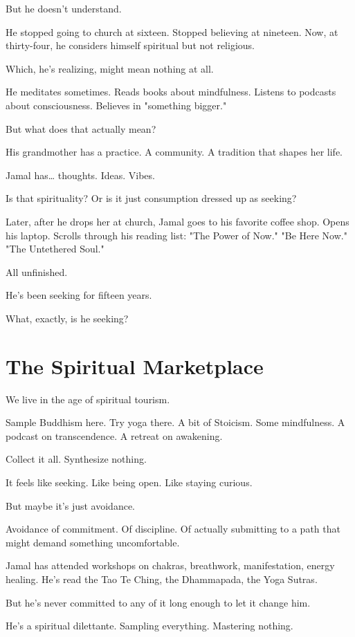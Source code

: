 \documentclass[11pt,twoside]{book}
\begin{document}
But he doesn't understand.

He stopped going to church at sixteen. Stopped believing at nineteen. Now, at thirty-four, he considers himself spiritual but not religious.

Which, he's realizing, might mean nothing at all.

He meditates sometimes. Reads books about mindfulness. Listens to podcasts about consciousness. Believes in "something bigger."

But what does that actually mean?

His grandmother has a practice. A community. A tradition that shapes her life.

Jamal has\ldots{} thoughts. Ideas. Vibes.

Is that spirituality? Or is it just consumption dressed up as seeking?

Later, after he drops her at church, Jamal goes to his favorite coffee shop. Opens his laptop. Scrolls through his reading list: "The Power of Now." "Be Here Now." "The Untethered Soul."

All unfinished.

He's been seeking for fifteen years.

What, exactly, is he seeking?

\section*{The Spiritual Marketplace}

We live in the age of spiritual tourism.

Sample Buddhism here. Try yoga there. A bit of Stoicism. Some mindfulness. A podcast on transcendence. A retreat on awakening.

Collect it all. Synthesize nothing.

It feels like seeking. Like being open. Like staying curious.

But maybe it's just avoidance.

Avoidance of commitment. Of discipline. Of actually submitting to a path that might demand something uncomfortable.

Jamal has attended workshops on chakras, breathwork, manifestation, energy healing. He's read the Tao Te Ching, the Dhammapada, the Yoga Sutras.

But he's never committed to any of it long enough to let it change him.

He's a spiritual dilettante. Sampling everything. Mastering nothing.
\end{document}
